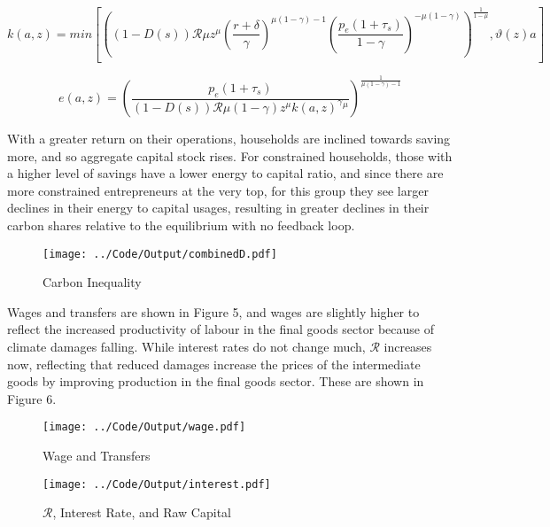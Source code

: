 \documentclass[12pt,a4paper]{article}
\begin{document}
\[k(a,z)=min\left[\left((1-D(s))\mathcal{R}\mu z^{\mu}\left(\frac{r+\delta}{\gamma}\right)^{\mu\left(1-\gamma\right)-1}\left(\frac{p_{e}(1+\tau_{s})}{1-\gamma}\right)^{-\mu(1-\gamma)}\right)^{\frac{1}{1-\mu}},\vartheta(z)a\right]\]

\[e(a,z)=\left(\frac{p_{e}(1+\tau_s)}{(1-D(s))\mathcal{R}\mu(1-\gamma)z^{\mu}k(a,z)^{\gamma}{}^{\mu}}\right)^{\frac{1}{\mu\left(1-\gamma\right)-1}}\]
     
     


  
  

With a greater return on their operations, households are inclined towards saving more, and so aggregate capital stock rises. For constrained households, those with a higher level of savings have a lower energy to capital ratio, and since there are more constrained entrepreneurs at the very top, for this group they see larger declines in their energy to capital usages, resulting in greater declines in their carbon shares relative to the equilibrium with no feedback loop. 


\begin{figure}[h!]
    \centering
    \caption{Carbon Inequality}
\texttt{[image: ../Code/Output/combinedD.pdf]}   
\end{figure}


\hspace*{6mm}  Wages and transfers are shown in Figure 5, and wages are slightly higher to reflect the increased productivity of labour in the final goods sector because of climate damages falling. While interest rates do not change much, $\mathcal{R}$ increases now, reflecting that reduced damages increase the prices of the intermediate goods by improving production in the final goods sector. These are shown in Figure 6.

\begin{figure}[h! tbp]
    \centering
    \caption{Wage and Transfers}
\texttt{[image: ../Code/Output/wage.pdf]}   
\end{figure}

\begin{figure}[h]
    \centering
    \caption{$\mathcal{R}$, Interest Rate, and Raw Capital}
\texttt{[image: ../Code/Output/interest.pdf]}   
\end{figure}
\end{document}
